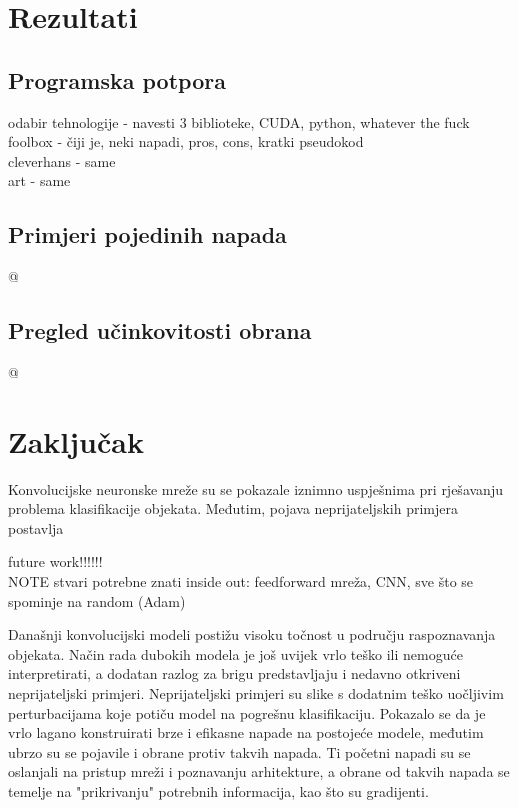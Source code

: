 \documentclass[utf8, diplomski]{fer}
\begin{document}
\chapter{Rezultati}
\section{Programska potpora}
odabir tehnologije - navesti 3 biblioteke, CUDA, python, whatever the fuck \\
foolbox - čiji je, neki napadi, pros, cons, kratki pseudokod \\
cleverhans - same \\
art - same \\
\section{Primjeri pojedinih napada}
@
\section{Pregled učinkovitosti obrana}
@

\chapter{Zaključak}
Konvolucijske neuronske mreže su se pokazale iznimno uspješnima pri rješavanju problema klasifikacije objekata. Međutim, pojava neprijateljskih primjera postavlja 

future work!!!!!! \\
NOTE stvari potrebne znati inside out: feedforward mreža, CNN, sve što se spominje na random (Adam)




\begin{sazetak}
Današnji konvolucijski modeli postižu visoku točnost u području raspoznavanja objekata. Način rada dubokih modela je još uvijek vrlo teško ili nemoguće interpretirati, a dodatan razlog za brigu predstavljaju i nedavno otkriveni neprijateljski primjeri. Neprijateljski primjeri su slike s dodatnim teško uočljivim perturbacijama koje potiču model na pogrešnu klasifikaciju. Pokazalo se da je vrlo lagano konstruirati brze i efikasne napade na postojeće modele, međutim  ubrzo su se pojavile i obrane protiv takvih napada. Ti početni napadi su se oslanjali na pristup mreži i poznavanju arhitekture, a obrane od takvih napada se temelje na "prikrivanju" potrebnih informacija, kao što su gradijenti.

\end{sazetak}
\end{document}
